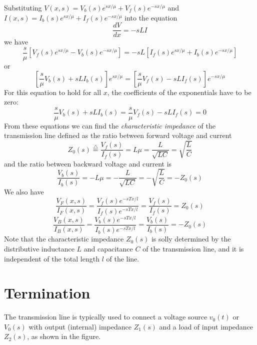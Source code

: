 Substituting $V(x,s)=V_b(s)e^{sx/\mu}+V_f(s)e^{-sx/\mu}$ and
$I(x,s)=I_b(s)e^{sx/\mu}+I_f(s)e^{-sx/\mu}$ into the equation
\[	\frac{dV}{dx}=-sLI	\]
we have
\[	\frac{s}{\mu}[V_f(s)e^{sx/\mu}-V_b(s)e^{-sx/\mu}]
	=-sL[I_f(s)e^{sx/\mu}+I_b(s)e^{-sx/\mu}]	\]
or 
\[ [\frac{s}{\mu}V_b(s)+sLI_b(s)]e^{sx/\mu}=
	[\frac{s}{\mu}V_f(s)-sLI_f(s)]e^{-sx/\mu}	\]
For this equation to hold for all $x$, the coefficients of the
exponentials have to be zero:
\[	\frac{s}{\mu}V_b(s)+sLI_b(s)=\frac{s}{\mu}V_f(s)-sLI_f(s)=0 \]
From these equations we can find the {\em characteristic impedance} 
of the transmission line defined as the ratio between forward voltage 
and current
\[	Z_0(s)\stackrel{\triangle}{=}\frac{V_f(s)}{I_f(s)}
	=L\mu=\frac{L}{\sqrt{LC}}=\sqrt{\frac{L}{C}}	\]
and the ratio between backward voltage and current is
\[	\frac{V_b(s)}{I_b(s)}=-L\mu=-\frac{L}{\sqrt{LC}}
	=-\sqrt{\frac{L}{C}}=-Z_0(s)	\]
We also have
\[	\frac{V_F(x,s)}{I_F(x,s)}
	=\frac{V_f(s)e^{-sTx/l}}{I_f(s)e^{-sTx/l}}
	=\frac{V_f(s)}{I_f(s)}=Z_0(s)	\]
\[	\frac{V_B(x,s)}{I_B(x,s)}
	=\frac{V_b(s)e^{-sTx/l}}{I_b(s)e^{-sTx/l}}
	=\frac{V_b(s)}{I_b(s)}=-Z_0(s)	\]
Note that the characteristic impedance $Z_0(s)$ is solly determined by the
distributive inductance $L$ and capacitance $C$ of the transmission
line, and it is independent of the total length $l$ of the line.

\newpage
\section*{Termination}

The transmission line is typically used to connect a voltage source
$v_0(t)$ or $V_0(s)$ with output (internal) impedance $Z_1(s)$ and a
load of input impedance $Z_2(s)$, as shown in the figure. 


